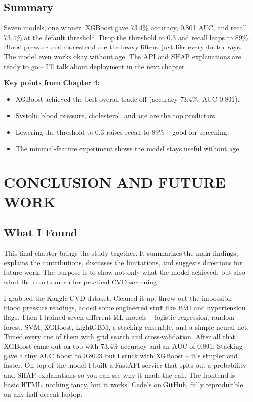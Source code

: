 \documentclass[12pt, a4paper, oneside]{book}
\begin{document}
\section{Summary}
Seven models, one winner. XGBoost gave 73.4\% accuracy, 0.801 AUC, and recall 73.4\% at the default threshold. Drop the threshold to 0.3 and recall leaps to 89\%. Blood pressure and cholesterol are the heavy lifters, just like every doctor says. The model even works okay without age. The API and SHAP explanations are ready to go – I'll talk about deployment in the next chapter.

\begin{takeaway}
\textbf{Key points from Chapter 4:}
\begin{itemize}
  \item XGBoost achieved the best overall trade-off (accuracy 73.4\%, AUC 0.801).
  \item Systolic blood pressure, cholesterol, and age are the top predictors.
  \item Lowering the threshold to 0.3 raises recall to 89\% – good for screening.
  \item The minimal-feature experiment shows the model stays useful without age.
\end{itemize}
\end{takeaway}

\chapter{CONCLUSION AND FUTURE WORK}

\section{What I Found}
This final chapter brings the study together. It summarizes the main findings, explains the contributions, discusses the limitations, and suggests directions for future work. The purpose is to show not only what the model achieved, but also what the results mean for practical CVD screening.

I grabbed the Kaggle CVD dataset. Cleaned it up, threw out the impossible blood pressure readings, added some engineered stuff like BMI and hypertension flags. Then I trained seven different ML models -- logistic regression, random forest, SVM, XGBoost, LightGBM, a stacking ensemble, and a simple neural net. Tuned every one of them with grid search and cross-validation. After all that XGBoost came out on top with 73.4\% accuracy and an AUC of 0.801. Stacking gave a tiny AUC boost to 0.8023 but I stuck with XGBoost -- it's simpler and faster. On top of the model I built a FastAPI service that spits out a probability and SHAP explanations so you can see why it made the call. The frontend is basic HTML, nothing fancy, but it works. Code's on GitHub, fully reproducible on any half-decent laptop.
\end{document}
